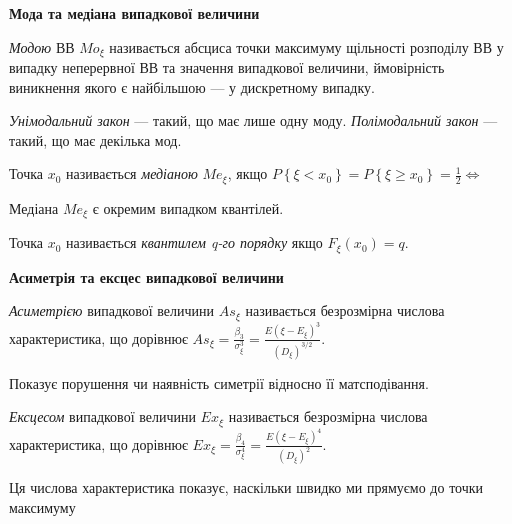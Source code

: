 \noindent \textbf{Мода та медіана випадкової величини}
\begin{definition}
    \emph{Модою} ВВ ${Mo}_\xi$ називається абсциса точки максимуму щільності 
    розподілу ВВ у випадку неперервної ВВ та значення випадкової величини, ймовірність 
    виникнення якого є найбільшою --- у дискретному випадку.

    \emph{Унімодальний закон} --- такий, що має лише одну моду. 
    \emph{Полімодальний закон} --- такий, що має декілька мод.
\end{definition}
\begin{definition}
    Точка $x_0$ називається \emph{медіаною} $Me_\xi$, якщо 
    $P\left\{\xi < x_0\right\} = P\left\{\xi \geq x_0\right\} 
    = \frac{1}{2} \Leftrightarrow $
\end{definition}
\begin{remark}
    Медіана $Me_\xi$ є окремим випадком квантілей.
\end{remark}
\begin{definition}
    Точка $x_0$ називається \emph{квантилем q-го порядку} якщо $F_\xi(x_0) = q$.
\end{definition}

\noindent \textbf{Асиметрія та ексцес випадкової величини}
\begin{definition}
    \emph{Асиметрією} випадкової величини $As_\xi$ називається безрозмірна 
    числова характеристика, що дорівнює $As_\xi = \frac{\beta_3}{\sigma_\xi^3} = 
    \frac{E(\xi - E_\xi)^3}{(D_\xi)^{3/2}}$.

    Показує порушення чи наявність симетрії відносно її матсподівання.
\end{definition}
\begin{definition}
    \emph{Ексцесом} випадкової величини $Ex_\xi$ називається безрозмірна 
    числова характеристика, що дорівнює $Ex_\xi = \frac{\beta_4}{\sigma_\xi^4} = 
    \frac{E(\xi - E_\xi)^4}{(D_\xi)^{2}}$.

    Ця числова характеристика показує, наскільки швидко ми прямуємо до точки 
    максимуму
\end{definition}
